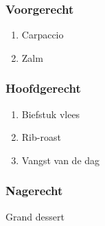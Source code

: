 \subsubsection*{Voorgerecht}
\begin{enumerate}
	\item Carpaccio
	\item Zalm
\end{enumerate}

\subsubsection*{Hoofdgerecht}
\begin{enumerate}
	\item Biefstuk vlees
	\item Rib-roast
	\item Vangst van de dag
\end{enumerate}

\subsubsection*{Nagerecht}
Grand dessert
